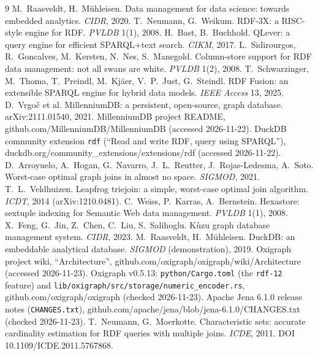 \documentclass[sigconf, nonacm]{acmart}
\begin{document}
\begin{thebibliography}{9}
 M.~Raasveldt, H.~M\"uhleisen. Data management for data science: towards embedded analytics. \emph{CIDR}, 2020.
 T.~Neumann, G.~Weikum. RDF-3X: a RISC-style engine for RDF. \emph{PVLDB} 1(1), 2008.
 H.~Bast, B.~Buchhold. QLever: a query engine for efficient SPARQL+text search. \emph{CIKM}, 2017.
 L.~Sidirourgos, R.~Goncalves, M.~Kersten, N.~Nes, S.~Manegold. Column-store support for RDF data management: not all swans are white. \emph{PVLDB} 1(2), 2008.
 T.~Schwarzinger, M.~Thoma, T.~Preindl, M.~Kj{\"a}er, V.~P.~Just, G.~Steindl. RDF Fusion: an extensible SPARQL engine for hybrid data models. \emph{IEEE Access} 13, 2025.
 D.~Vrgo{\v c} et al. MillenniumDB: a persistent, open-source, graph database. arXiv:2111.01540, 2021.
 MillenniumDB project README, github.com/MillenniumDB/MillenniumDB (accessed 2026-11-22).
 DuckDB community extension \texttt{rdf} (``Read and write RDF, query using SPARQL''), duckdb.org/community\_extensions/extensions/rdf (accessed 2026-11-22).
 D.~Arroyuelo, A.~Hogan, G.~Navarro, J.~L.~Reutter, J.~Rojas-Ledesma, A.~Soto. Worst-case optimal graph joins in almost no space. \emph{SIGMOD}, 2021.
 T.~L.~Veldhuizen. Leapfrog triejoin: a simple, worst-case optimal join algorithm. \emph{ICDT}, 2014 (arXiv:1210.0481).
 C.~Weiss, P.~Karras, A.~Bernstein. Hexastore: sextuple indexing for Semantic Web data management. \emph{PVLDB} 1(1), 2008.
 X.~Feng, G.~Jin, Z.~Chen, C.~Liu, S.~Salihoglu. K\`uzu graph database management system. \emph{CIDR}, 2023.
 M.~Raasveldt, H.~M\"uhleisen. DuckDB: an embeddable analytical database. \emph{SIGMOD} (demonstration), 2019.
 Oxigraph project wiki, ``Architecture'', github.com/oxigraph/oxigraph/wiki/Architecture (accessed 2026-11-23).
 Oxigraph v0.5.13: \texttt{python/Cargo.toml} (the \texttt{rdf-12} feature) and \texttt{lib/oxigraph/src/storage/numeric\_encoder.rs}, github.com/oxigraph/oxigraph (checked 2026-11-23).
 Apache Jena 6.1.0 release notes (\texttt{CHANGES.txt}), github.com/apache/jena/blob/jena-6.1.0/CHANGES.txt (checked 2026-11-23).
 T.~Neumann, G.~Moerkotte. Characteristic sets: accurate cardinality estimation for RDF queries with multiple joins. \emph{ICDE}, 2011. DOI 10.1109/ICDE.2011.5767868.

\end{thebibliography}
\end{document}
